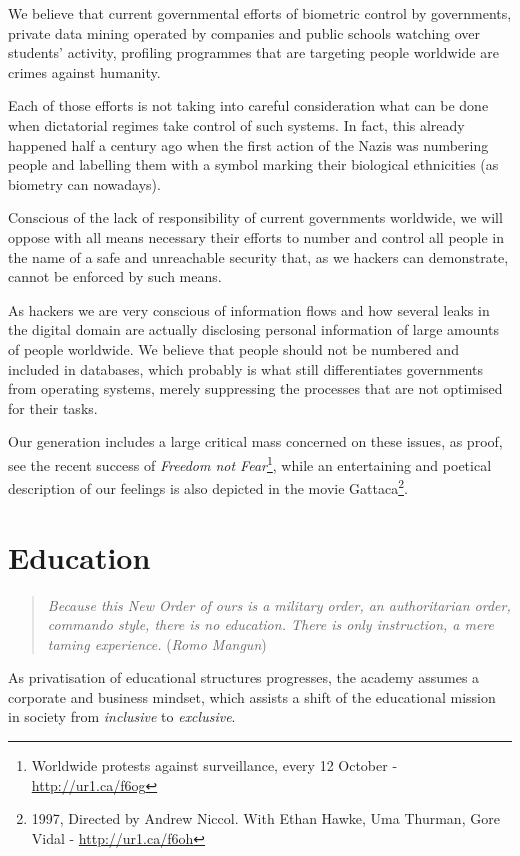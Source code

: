 We believe that current governmental ef\hbox{}forts of biometric control by
governments, private data mining operated by companies and public schools
watching over students' activity, prof\hbox{}iling programmes that are targeting
people worldwide are crimes against humanity.

Each of those ef\hbox{}forts is not taking into careful consideration what can
be done when dictatorial regimes take control of such systems. In fact, this
already happened half a century ago when the f\hbox{}irst action of the Nazis
was numbering people and labelling them with a symbol marking their biological
ethnicities (as biometry can nowadays).

Conscious of the lack of responsibility of current governments worldwide, we
will oppose with all means necessary their ef\hbox{}forts to number and control
all people in the name of a safe and unreachable security that, as we hackers
can demonstrate, cannot be enforced by such means.

As hackers we are very conscious of information f\hbox{}lows and how several
leaks in the digital domain are actually disclosing personal information of
large amounts of people worldwide. We believe that people should not be numbered
and included in databases, which probably is what still dif\hbox{}ferentiates
governments from operating systems, merely suppressing the processes that are
not optimised for their tasks.

Our generation includes a large critical mass concerned on these issues, as
proof, see the recent success of \textit{Freedom not Fear}\footnote{Worldwide
protests against surveillance, every 12 October - \url{http://ur1.ca/f6og}},
while an entertaining and poetical description of our feelings is also depicted
in the movie Gattaca\footnote{1997, Directed by Andrew Niccol. With Ethan Hawke,
Uma Thurman, Gore Vidal - \url{http://ur1.ca/f6oh}}.


\section{Education}
\label{s:weaver_birds:education}


\begin{quote}
\textit{Because this New Order of ours is a military order, an authoritarian
order, commando style, there is no education. There is only instruction, a mere
taming experience.} (\textit{Romo Mangun})
\end{quote}

As privatisation of educational structures progresses, the academy assumes a
corporate and business mindset, which assists a shift of the educational mission
in society from \textit{inclusive} to \textit{exclusive}.

